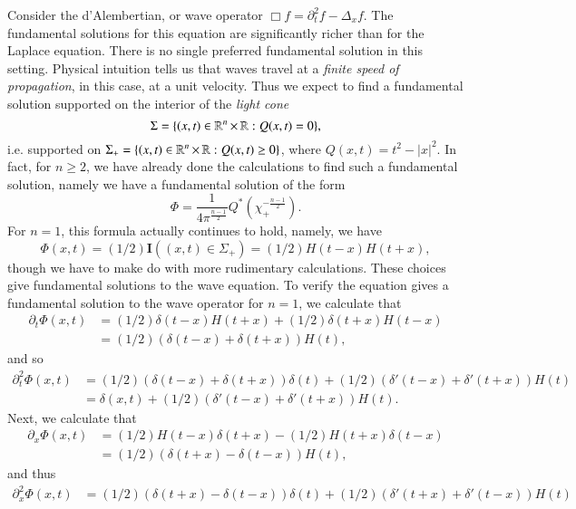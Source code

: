 \begin{example}
    Consider the d'Alembertian, or wave operator $\Box f = \partial_t^2 f - \Delta_x f$. The fundamental solutions for this equation are significantly richer than for the Laplace equation. There is no single preferred fundamental solution in this setting. Physical intuition tells us that waves travel at a \emph{finite speed of propagation}, in this case, at a unit velocity. Thus we expect to find a fundamental solution supported on the interior of the \emph{light cone}
    \[ \Sigma = \{ (x,t) \in \operatorname{\mathbb{R}}^n \times \operatorname{\mathbb{R}}: Q(x,t) = 0 \}, \]
    i.e. supported on $\Sigma_+ = \{ (x,t) \in \operatorname{\mathbb{R}}^n \times \operatorname{\mathbb{R}}: Q(x,t) \geq 0 \}$, where $Q(x,t) = t^2 - |x|^2$. In fact, for $n \geq 2$, we have already done the calculations to find such a fundamental solution, namely we have a fundamental solution of the form
    \[ \Phi = \frac{1}{4 \pi^{\frac{n-1}{2}}} Q^* \left(\chi_+^{-\frac{n-1}{2}} \right). \]
    For $n = 1$, this formula actually continues to hold, namely, we have
    \[ \Phi(x,t) = (1/2) \mathbf{I}((x,t) \in \Sigma_+) = (1/2) H(t - x) H(t + x), \]
    though we have to make do with more rudimentary calculations. These choices give fundamental solutions to the wave equation. To verify the equation gives a fundamental solution to the wave operator for $n = 1$, we calculate that
    \begin{align*}
        \partial_t \Phi(x,t) &= (1/2) \delta(t - x) H(t + x) + (1/2) \delta(t + x) H(t - x)\\
        &= (1/2) \left( \delta(t - x) + \delta(t + x) \right) H(t),
    \end{align*}
    and so
    \begin{align*}
        \partial_t^2 \Phi(x,t) &= (1/2) \left( \delta(t - x) + \delta(t + x) \right) \delta(t) + (1/2) \left( \delta'(t-x) + \delta'(t + x) \right) H(t)\\
        &= \delta(x,t) + (1/2) \left( \delta'(t-x) + \delta'(t + x) \right) H(t).
    \end{align*}
    Next, we calculate that
    \begin{align*}
        \partial_x \Phi(x,t) &= (1/2) H(t - x) \delta(t + x) - (1/2) H(t + x) \delta(t-x)\\
        &= (1/2) \left( \delta(t + x) - \delta(t - x) \right) H(t),
    \end{align*}
    and thus
    \begin{align*}
        \partial_x^2 \Phi(x,t) &= (1/2) \left( \delta(t + x) - \delta(t - x) \right) \delta(t) + (1/2) \left( \delta'(t + x) + \delta'(t - x) \right) H(t)\\

\end{align*}
\end{example}
